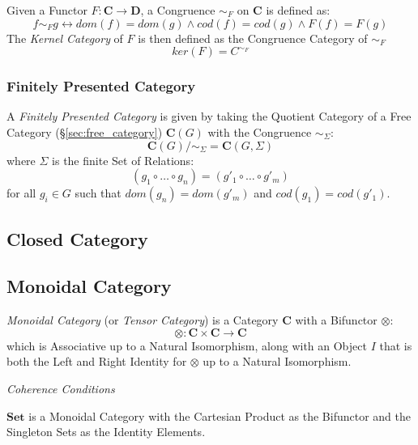 Given a Functor $F : \mathbf{C} \rightarrow \mathbf{D}$, a Congruence
$\sim_F$ on $\mathbf{C}$ is defined as:
\[
  f \sim_F g \leftrightarrow dom(f) = dom(g) \wedge cod(f) = cod(g)
  \wedge F(f) = F(g)
\]
The \emph{Kernel Category} of $F$ is then defined as the Congruence
Category of $\sim_F$
\[
  ker(F) = C^{\sim_F}
\]



\subsubsection{Finitely Presented Category}
\label{sec:finitely_presented}

A \emph{Finitely Presented Category} is given by taking the Quotient
Category of a Free Category (\S\ref{sec:free_category})
$\mathbf{C}(G)$ with the Congruence $\sim_\Sigma$:
\[
  \mathbf{C}(G) / \sim_{\Sigma} = \mathbf{C}(G,\Sigma)
\]
where $\Sigma$ is the finite Set of Relations:
\[
  (g_1 \circ \ldots \circ g_n) = (g'_1 \circ \ldots \circ g'_m)
\]
for all $g_i \in G$ such that $dom(g_n) = dom(g'_m)$ and $cod(g_1) =
cod(g'_1)$.



\subsection{Closed Category}\label{sec:closed_category}

\subsection{Monoidal Category}\label{sec:monoidal_category}

\emph{Monoidal Category} (or \emph{Tensor Category}) is a Category
$\mathbf{C}$ with a Bifunctor $\otimes$:
\[
  \otimes : \mathbf{C} \times \mathbf{C} \rightarrow \mathbf{C}
\]
which is Associative up to a Natural Isomorphism, along with an Object
$I$ that is both the Left and Right Identity for $\otimes$ up to a
Natural Isomorphism.

\emph{Coherence Conditions}

$\mathbf{Set}$ is a Monoidal Category with the Cartesian Product as
the Bifunctor and the Singleton Sets as the Identity Elements.

